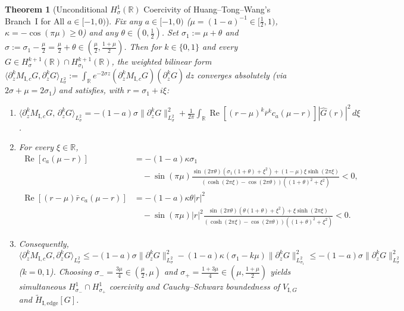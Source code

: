 \documentclass[11pt,a4paper]{article}
\newtheorem{thm}{Theorem}
\begin{document}
\begin{thm}[Unconditional $H^1_\sigma(\mathbb{R})$ Coercivity of Huang--Tong--Wang's Branch~I for All $a \in [-1,0)$]\label{thm:branch1_h1}
Fix any $a \in [-1, 0)$ ($\mu = (1-a)^{-1} \in [\frac{1}{2},1)$, $\kappa = -\cos(\pi\mu) \ge 0$) and any $\theta \in (0,\frac{1}{2})$. Set $\sigma_1 := \mu + \theta$ and $\sigma := \sigma_1 - \frac{\mu}{2} = \frac{\mu}{2} + \theta \in (\frac{\mu}{2}, \frac{1+\mu}{2})$. Then for $k \in \{0,1\}$ and every $G \in H^{k+1}_\sigma(\mathbb{R}) \cap H^{k+1}_{\sigma_1}(\mathbb{R})$, the weighted bilinear form $\langle \partial_z^k M_{\mathrm{I},c} G, \partial_z^k G\rangle_{L^2_\sigma} := \int_{\mathbb{R}} e^{-2\sigma z}(\partial_z^k M_{\mathrm{I},c} G)(\partial_z^k G)\,dz$ converges absolutely (via $2\sigma + \mu = 2\sigma_1$) and satisfies, with $r = \sigma_1 + i\xi$:
\begin{enumerate}
  \item $\langle \partial_z^k M_{\mathrm{I},c} G,\, \partial_z^k G\rangle_{L^2_\sigma} = -(1-a)\sigma\|\partial_z^k G\|_{L^2_\sigma}^2 + \frac{1}{2\pi}\int_{\mathbb{R}} \operatorname{Re}[(r-\mu)^k\bar r^k c_a(\mu-r)]|\widehat{G}(r)|^2\,d\xi$.
  \item For every $\xi \in \mathbb{R}$,
  \begin{align*}
  \operatorname{Re}[c_a(\mu-r)]
  &= -(1-a)\kappa\sigma_1 \\
  &\quad - \sin(\pi\mu)\frac{\sin(2\pi\theta)(\sigma_1(1+\theta)+\xi^2) + (1-\mu)\xi\sinh(2\pi\xi)}{(\cosh(2\pi\xi)-\cos(2\pi\theta))((1+\theta)^2+\xi^2)} < 0, \\
  \operatorname{Re}[(r-\mu)\bar r\,c_a(\mu-r)]
  &= -(1-a)\kappa\theta|r|^2 \\
  &\quad - \sin(\pi\mu)|r|^2\frac{\sin(2\pi\theta)(\theta(1+\theta)+\xi^2) + \xi\sinh(2\pi\xi)}{(\cosh(2\pi\xi)-\cos(2\pi\theta))((1+\theta)^2+\xi^2)} < 0.
  \end{align*}
  \item Consequently, $\langle \partial_z^k M_{\mathrm{I},c} G, \partial_z^k G\rangle_{L^2_\sigma} \le -(1-a)\sigma\|\partial_z^k G\|_{L^2_\sigma}^2 - (1-a)\kappa(\sigma_1 - k\mu)\|\partial_z^k G\|_{L^2_{\sigma_1}}^2 \le -(1-a)\sigma\|\partial_z^k G\|_{L^2_\sigma}^2$ ($k = 0,1$). Choosing $\sigma_- = \frac{3\mu}{4} \in (\frac{\mu}{2},\mu)$ and $\sigma_+ = \frac{1+3\mu}{4} \in (\mu,\frac{1+\mu}{2})$ yields simultaneous $H^1_{\sigma_-}\cap H^1_{\sigma_+}$ coercivity and Cauchy--Schwarz boundedness of $V_{\mathrm{I},G}$ and $\widetilde{H}_{\mathrm{I},\mathrm{edge}}[G]$.
\end{enumerate}
\end{thm}
\end{document}
